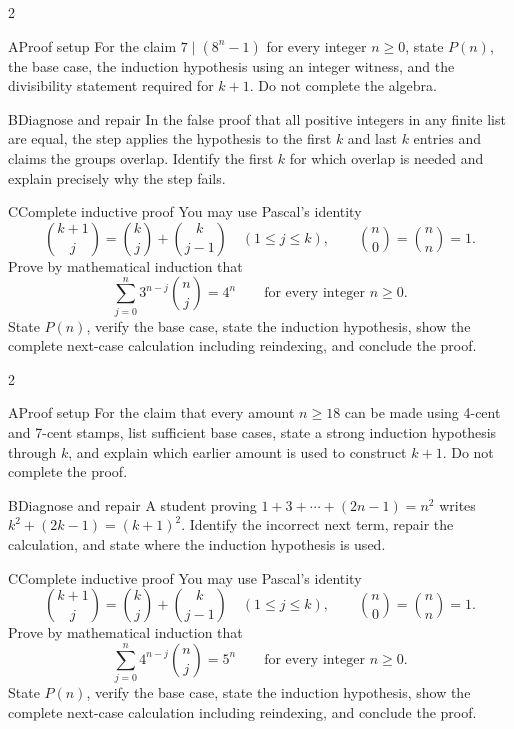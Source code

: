 \documentclass[9pt]{extarticle}
\begin{document}
\CoreWorkArea
\FormBreak
{}
\begin{multicols}{2}
\begin{CompactCoreProblem}{A}{Proof setup}
For the claim $7\mid(8^n-1)$ for every integer $n\ge0$, state $P(n)$, the base case, the induction hypothesis using an integer witness, and the divisibility statement required for $k+1$. Do not complete the algebra.
\end{CompactCoreProblem}
\begin{CompactCoreProblem}{B}{Diagnose and repair}
In the false proof that all positive integers in any finite list are equal, the step applies the hypothesis to the first $k$ and last $k$ entries and claims the groups overlap. Identify the first $k$ for which overlap is needed and explain precisely why the step fails.
\end{CompactCoreProblem}
\end{multicols}
\begin{CompactCoreProblem}{C}{Complete inductive proof}
You may use Pascal's identity
\[
\binom{k+1}{j}=\binom{k}{j}+\binom{k}{j-1}
\quad(1\le j\le k),\qquad
\binom{n}{0}=\binom{n}{n}=1.
\]
Prove by mathematical induction that
\[
\sum_{j=0}^{n} 3^{n-j}\binom{n}{j}=4^n\qquad\text{for every integer }n\ge0.
\]
State $P(n)$, verify the base case, state the induction hypothesis, show the complete next-case calculation including reindexing, and conclude the proof.
\end{CompactCoreProblem}
\CoreWorkArea
\FormBreak
{}
\begin{multicols}{2}
\begin{CompactCoreProblem}{A}{Proof setup}
For the claim that every amount $n\ge18$ can be made using 4-cent and 7-cent stamps, list sufficient base cases, state a strong induction hypothesis through $k$, and explain which earlier amount is used to construct $k+1$. Do not complete the proof.
\end{CompactCoreProblem}
\begin{CompactCoreProblem}{B}{Diagnose and repair}
A student proving $1+3+\cdots+(2n-1)=n^2$ writes $k^2+(2k-1)=(k+1)^2$. Identify the incorrect next term, repair the calculation, and state where the induction hypothesis is used.
\end{CompactCoreProblem}
\end{multicols}
\begin{CompactCoreProblem}{C}{Complete inductive proof}
You may use Pascal's identity
\[
\binom{k+1}{j}=\binom{k}{j}+\binom{k}{j-1}
\quad(1\le j\le k),\qquad
\binom{n}{0}=\binom{n}{n}=1.
\]
Prove by mathematical induction that
\[
\sum_{j=0}^{n} 4^{n-j}\binom{n}{j}=5^n\qquad\text{for every integer }n\ge0.
\]
State $P(n)$, verify the base case, state the induction hypothesis, show the complete next-case calculation including reindexing, and conclude the proof.
\end{CompactCoreProblem}
\end{document}
